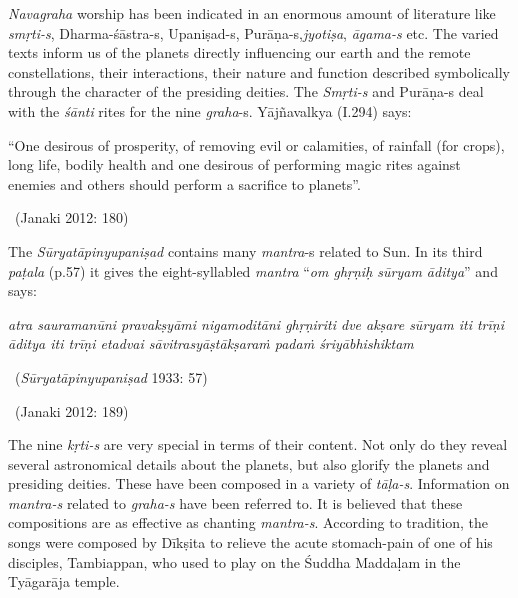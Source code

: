 \textit{Navagraha} worship has been indicated in an enormous amount of literature like \textit{smṛti-s}, Dharma-śāstra-s, Upaniṣad-s, Purāṇa-s,\break \textit{jyotiṣa}, \textit{āgama-s} etc. The varied texts inform us of the planets directly influencing our earth and the remote constellations, their interactions, their nature and function described symbolically through the character of the presiding deities. The \textit{Smṛti-s} and Purāṇa-s deal with the \textit{śānti} rites for the nine \textit{graha}-s. Yājñavalkya (I.294) says:

\begin{myquote}
“One desirous of prosperity, of removing evil or calamities, of rainfall (for crops), long life, bodily health and one desirous of performing magic rites against enemies and others should perform a sacrifice to planets”.

~\hfill (Janaki 2012: 180)
\end{myquote}

The \textit{Sūryatāpinyupaniṣad} contains many \textit{mantra}-s related to Sun. In its third \textit{paṭala} (p.57) it gives the eight-syllabled \textit{mantra} “\textit{om ghṛṇiḥ sūryam āditya}” and says:

\begin{myquote}
\textit{atra sauramanūni pravakṣyāmi nigamoditāni  ghṛṇiriti dve akṣare  sūryam iti trīṇi  āditya iti trīṇi  etadvai sāvitrasyāṣtākṣaraṁ padaṁ śriyābhishiktam } 

~\hfill (\textit{Sūryatāpinyupaniṣad} 1933: 57)
\end{myquote}

\vspace{-.1cm}

\begin{myquote}

~\hfill (Janaki 2012: 189)
\end{myquote}

The nine \textit{kṛti-s} are very special in terms of their content. Not only do they reveal several astronomical details about the planets, but also glorify the planets and presiding deities. These have been composed in a variety of \textit{tāḷa-s}. Information on \textit{mantra-s} related to \textit{graha-s} have been referred to. It is believed that these compositions are as effective as chanting \textit{mantra-s}. According to tradition, the songs were composed by Dīkṣita to relieve the acute stomach-pain of one of his disciples, Tambiappan, who used to play on the Śuddha Maddaḷam in the Tyāgarāja temple.

